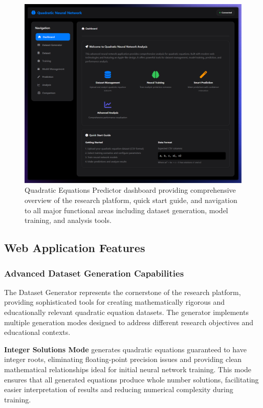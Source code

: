 \documentclass[11pt,a4paper]{report}
\begin{document}
\begin{figure}[H]
\centering
\includegraphics[width=\textwidth]{quadratic_predictor_dashboard.png}
\caption{Quadratic Equations Predictor dashboard providing comprehensive overview of the research platform, quick start guide, and navigation to all major functional areas including dataset generation, model training, and analysis tools.}
\label{fig:quadratic_dashboard}
\end{figure}

\subsection{Web Application Features}

\subsubsection{Advanced Dataset Generation Capabilities}

The Dataset Generator represents the cornerstone of the research platform, providing sophisticated tools for creating mathematically rigorous and educationally relevant quadratic equation datasets. The generator implements multiple generation modes designed to address different research objectives and educational contexts.

\textbf{Integer Solutions Mode} generates quadratic equations guaranteed to have integer roots, eliminating floating-point precision issues and providing clean mathematical relationships ideal for initial neural network training. This mode ensures that all generated equations produce whole number solutions, facilitating easier interpretation of results and reducing numerical complexity during training.
\end{document}
